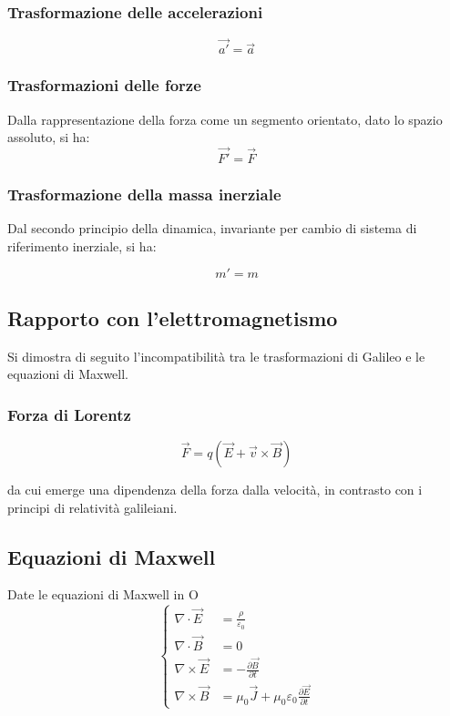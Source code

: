 \documentclass{article}
\begin{document}
\subsubsection{
    Trasformazione delle accelerazioni
}
\begin{equation}
    \vec{a'} = \vec{a}
\end{equation}

\subsubsection{Trasformazioni delle forze}
Dalla rappresentazione della forza come un segmento orientato, dato lo spazio assoluto, si ha:
\begin{equation}
    \vec{F'} = \vec{F}
\end{equation}

\subsubsection{Trasformazione della massa inerziale}
Dal secondo principio della dinamica, invariante per cambio di sistema di riferimento inerziale, si ha:

\begin{equation}
    m' = m
\end{equation}


\subsection{Rapporto con l'elettromagnetismo}
Si dimostra di seguito l'incompatibilità tra le trasformazioni di Galileo e le equazioni di Maxwell.

\subsubsection{Forza di Lorentz}
\begin{equation}
    \vec{F} = q(\vec{E} + \vec{v} \times \vec{B})
\end{equation}

da cui emerge una dipendenza della forza dalla velocità, in contrasto con i principi di relatività galileiani.

\subsection*{Equazioni di Maxwell}
Date le equazioni di Maxwell in O
\begin{equation}
    \left\{
    \begin{aligned}
        \nabla \cdot \vec{E}  & = \frac{\rho}{\varepsilon_0}                                              \\
        \nabla \cdot \vec{B}  & = 0                                                                       \\
        \nabla \times \vec{E} & = -\frac{\partial \vec{B}}{\partial t}                                    \\
        \nabla \times \vec{B} & = \mu_0 \vec{J} + \mu_0 \varepsilon_0 \frac{\partial \vec{E}}{\partial t}
    \end{aligned}
    \right.
\end{equation}
\end{document}
